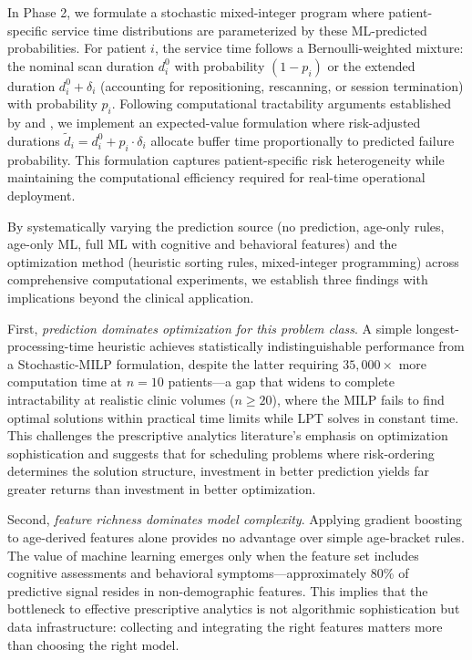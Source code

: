 \documentclass[11pt,a4paper]{article}
\begin{document}
In Phase 2, we formulate a stochastic mixed-integer program where patient-specific service time distributions are parameterized by these ML-predicted probabilities. For patient $i$, the service time follows a Bernoulli-weighted mixture: the nominal scan duration $d_i^0$ with probability $(1-p_i)$ or the extended duration $d_i^0 + \delta_i$ (accounting for repositioning, rescanning, or session termination) with probability $p_i$. Following computational tractability arguments established by \citet{denton2003sequential} and \citet{mancilla2012sample}, we implement an expected-value formulation where risk-adjusted durations $\tilde{d}_i = d_i^0 + p_i \cdot \delta_i$ allocate buffer time proportionally to predicted failure probability. This formulation captures patient-specific risk heterogeneity while maintaining the computational efficiency required for real-time operational deployment.

By systematically varying the prediction source (no prediction, age-only rules, age-only ML, full ML with cognitive and behavioral features) and the optimization method (heuristic sorting rules, mixed-integer programming) across comprehensive computational experiments, we establish three findings with implications beyond the clinical application.

First, \textit{prediction dominates optimization for this problem class}. A simple longest-processing-time heuristic achieves statistically indistinguishable performance from a Stochastic-MILP formulation, despite the latter requiring $35{,}000\times$ more computation time at $n = 10$ patients---a gap that widens to complete intractability at realistic clinic volumes ($n \geq 20$), where the MILP fails to find optimal solutions within practical time limits while LPT solves in constant time. This challenges the prescriptive analytics literature's emphasis on optimization sophistication and suggests that for scheduling problems where risk-ordering determines the solution structure, investment in better prediction yields far greater returns than investment in better optimization.

Second, \textit{feature richness dominates model complexity}. Applying gradient boosting to age-derived features alone provides no advantage over simple age-bracket rules. The value of machine learning emerges only when the feature set includes cognitive assessments and behavioral symptoms---approximately 80\% of predictive signal resides in non-demographic features. This implies that the bottleneck to effective prescriptive analytics is not algorithmic sophistication but data infrastructure: collecting and integrating the right features matters more than choosing the right model.
\end{document}
